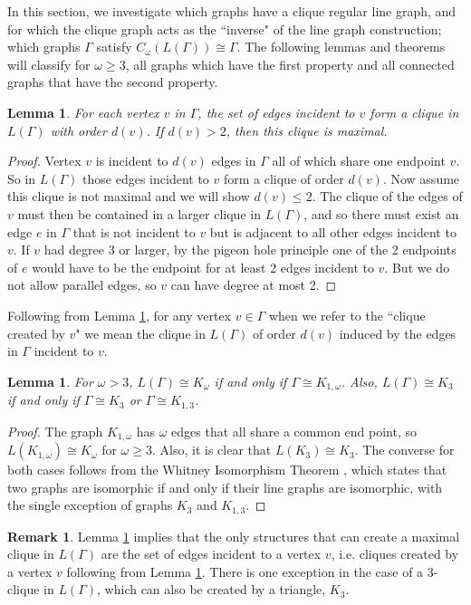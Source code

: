 \documentclass[12pt]{report}
\newtheorem{lem}[thm]{Lemma}
\theoremstyle{definition}
\newtheorem{remark}[thm]{Remark}
\begin{document}
In this section, we investigate which graphs have a clique regular line graph, and for which the clique graph acts as the ``inverse" of the line graph construction; which graphs $\Gamma$ satisfy $C_\omega(L(\Gamma))\cong \Gamma$. The following lemmas and theorems will classify for $\omega \geq 3$, all graphs which have the first property and all connected graphs that have the second property.
\begin{lem} \label{lem:d(v)}
    For each vertex $v$ in $\Gamma$, the set of edges incident to $v$ form a clique in $L(\Gamma)$ with order $d(v)$. If $d(v) > 2$, then this clique is maximal.
\end{lem}
\begin{proof}
    Vertex $v$ is incident to $d(v)$ edges in $\Gamma$ all of which share one endpoint $v$. So in $L(\Gamma)$ those edges incident to $v$ form a clique of order $d(v)$. Now assume this clique is not maximal and we will show $d(v) \leq 2$. The clique of the edges of $v$ must then be contained in a larger clique in $L(\Gamma)$, and so there must exist an edge $e$ in $\Gamma$ that is not incident to $v$ but is adjacent to all other edges incident to $v$. If $v$ had degree 3 or larger, by the pigeon hole principle one of the 2 endpoints of $e$ would have to be the endpoint for at least 2 edges incident to $v$. But we do not allow parallel edges, so $v$ can have degree at most 2.
\end{proof}
Following from Lemma \ref{lem:d(v)}, for any vertex $v \in \Gamma$ when we refer to the ``clique created by $v$" we mean the clique in $L(\Gamma)$ of order $d(v)$ induced by the edges in $\Gamma$ incident to $v$.
\begin{lem} \label{lem:whit}
    For $\omega>3$, $L(\Gamma) \cong K_\omega$ if and only if $\Gamma \cong K_{1,\omega}$. Also, $L(\Gamma) \cong K_3$ if and only if $\Gamma \cong K_3$ or $\Gamma \cong K_{1,3}$.
\end{lem}
\begin{proof}
    The graph $K_{1,\omega}$ has $\omega$ edges that all share a common end point, so $L(K_{1,\omega}) \cong K_\omega$ for $\omega \geq 3$. Also, it is clear that $L(K_3) \cong K_3$. The converse for both cases follows from the Whitney Isomorphism Theorem \cite{whitney}, which states that two graphs are isomorphic if and only if their line graphs are isomorphic, with the single exception of graphs $K_3$ and $K_{1,3}$.
\end{proof}
\begin{remark} \label{remark}
    Lemma \ref{lem:whit} implies that the only structures that can create a maximal clique in $L(\Gamma)$ are the set of edges incident to a vertex $v$, i.e. cliques created by a vertex $v$ following from Lemma \ref{lem:d(v)}. There is one exception in the case of a 3-clique in $L(\Gamma)$, which can also be created by a triangle, $K_3$.
\end{remark}
\end{document}

